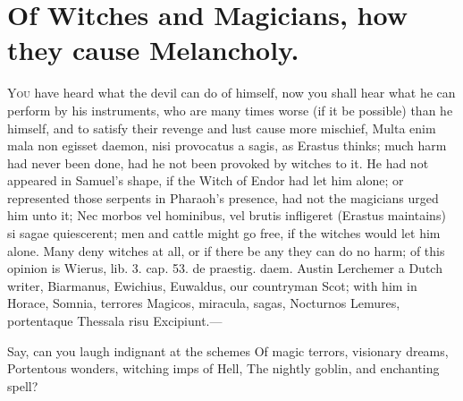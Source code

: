 {{\section[Witches and Magicians]{Of Witches and Magicians, how they cause Melancholy.}

\lettrine{Y}{ou} have heard what the devil can do of himself, now you shall hear
what he can perform by his instruments, who are many times worse (if it
be possible) than he himself, and to satisfy their revenge and lust
cause more mischief, Multa enim mala non egisset daemon, nisi
provocatus a sagis, as Erastus thinks; much harm had never been
done, had he not been provoked by witches to it. He had not appeared in
Samuel's shape, if the Witch of Endor had let him alone; or represented
those serpents in Pharaoh's presence, had not the magicians urged him
unto it; Nec morbos vel hominibus, vel brutis infligeret (Erastus
maintains) si sagae quiescerent; men and cattle might go free, if the
witches would let him alone. Many deny witches at all, or if there be
any they can do no harm; of this opinion is Wierus, lib. 3. cap. 53. de
praestig. daem. Austin Lerchemer a Dutch writer, Biarmanus, Ewichius,
Euwaldus, our countryman Scot; with him in Horace,
Somnia, terrores Magicos, miracula, sagas,
Nocturnos Lemures, portentaque Thessala risu
Excipiunt.---

Say, can you laugh indignant at the schemes
Of magic terrors, visionary dreams,
Portentous wonders, witching imps of Hell,
The nightly goblin, and enchanting spell?

}}
